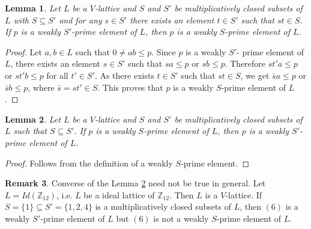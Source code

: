 \documentclass[10pt,twoside,a4paper]{amsart}
\numberwithin{equation}{section}
\theoremstyle{plain}
\newtheorem{lem}{Lemma}[section]
\newtheorem{cor}[lem]{Corollary}
\theoremstyle{definition}
\newtheorem{rem}[lem]{Remark}
\begin{document}
	
	


\begin{lem}
	Let $L$ be a $V$-lattice and $S$ and $S'$  be multiplicatively closed subsets of $L$ with  $S \subseteq S'$ and for any $s \in S'$ there exists an element $t \in S'$ such that $st \in S$.  If $p$ is a weakly $S'$-prime element of $L$, then $p$ is a weakly $S$-prime element of $L$.
\end{lem}

\begin{proof} 
	Let $a,b \in L$ such that $0\neq ab \leq p$. Since $p$ is a weakly $S'$- prime element of $L$, there exists an element $s \in S'$ such that $sa \leq p$ or $sb \leq p$. Therefore $st'a \leq p$ or $st'b \leq p$  for all $t' \in S'$. As there exists $t \in S'$ such that $ st \in S$, we get $\bar{s}a \leq p$ or $\bar{s}b \leq p$, where $\bar{s} =s t' \in S$. This proves that $p$ is a weakly $S$-prime element of $L$.  
\end{proof}

\begin{lem}\label{L4.20}
	Let $L$ be a $V$-lattice and $S$ and $S'$  be multiplicatively closed subsets of $L$ such that $S \subseteq S'$.  If $p$ is a weakly $S$-prime element of $L$, then $p$ is a weakly $S'$-prime element of $L$.
\end{lem}

\begin{proof}
	Follows from the definition of a weakly $S$-prime element.
\end{proof}

\begin{rem}
	Converse of the Lemma \ref{L4.20} need not be true in general. Let $L=Id(\mathbb{Z}_{12})$, i.e. $L$ be a ideal lattice of $\mathbb{Z}_{12}$. Then $L$ is a $V$-lattice. If $S =\{1\} \subseteq S' =\{1,2,4\}$ is a multiplicatively closed subsets of $L$, then $(6)$ is a weakly $S'$-prime element of $L$ but $(6)$ is  not a weakly $S$-prime element of $L$. 
\end{rem}
\end{document}
